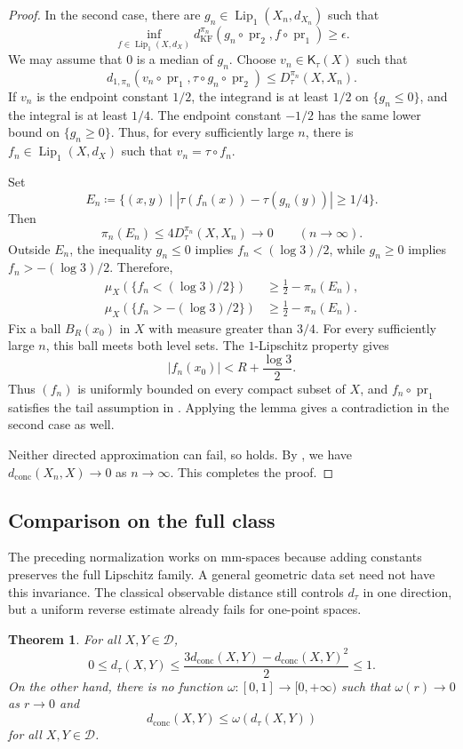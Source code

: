 \documentclass[10pt,a4paper]{amsart}
\newtheorem{theorem}{Theorem}[section]
\newcommand{\D}{\mathcal D}
\newcommand{\Kc}{\mathsf K}
\newcommand{\dconc}{d_{\mathrm{conc}}}
\newcommand{\dtau}{d_{\tau}}
\newcommand{\kf}{d_{\operatorname{KF}}}
\DeclareMathOperator{\pr}{pr}
\begin{document}
\begin{proof}
In the second case, there are $g_n\in\operatorname{Lip}_1(X_n,d_{X_n})$ such that
\[
\inf_{f\in\operatorname{Lip}_1(X,d_X)}
\kf^{\pi_n}(g_n\circ\pr_2,f\circ\pr_1)\geq\epsilon.
\]
We may assume that $0$ is a median of $g_n$. Choose $v_n\in\Kc_\tau(X)$ such that
\[
d_{1,\pi_n}(v_n\circ\pr_1,\tau\circ g_n\circ\pr_2)
\leq D_\tau^{\pi_n}(X,X_n).
\]
If $v_n$ is the endpoint constant $1/2$, the integrand is at least $1/2$ on $\{g_n\leq0\}$, and the integral is at least $1/4$. The endpoint constant $-1/2$ has the same lower bound on $\{g_n\geq0\}$. Thus, for every sufficiently large $n$, there is $f_n\in\operatorname{Lip}_1(X,d_X)$ such that $v_n=\tau\circ f_n$.

Set
\[
E_n\coloneqq
\{(x,y)\mid|\tau(f_n(x))-\tau(g_n(y))|\geq1/4\}.
\]
Then
\[
\pi_n(E_n)\leq4D_\tau^{\pi_n}(X,X_n)\longrightarrow0
\qquad(n\to\infty).
\]
Outside $E_n$, the inequality $g_n\leq0$ implies $f_n<(\log3)/2$, while $g_n\geq0$ implies $f_n>-(\log3)/2$. Therefore,
\[
\begin{aligned}
\mu_X(\{f_n<(\log3)/2\})&\geq\frac12-\pi_n(E_n),\\
\mu_X(\{f_n>-(\log3)/2\})&\geq\frac12-\pi_n(E_n).
\end{aligned}
\]
Fix a ball $B_R(x_0)$ in $X$ with measure greater than $3/4$. For every sufficiently large $n$, this ball meets both level sets. The $1$-Lipschitz property gives
\[
|f_n(x_0)|<R+\frac{\log3}{2}.
\]
Thus $(f_n)$ is uniformly bounded on every compact subset of $X$, and $f_n\circ\pr_1$ satisfies the tail assumption in . Applying the lemma gives a contradiction in the second case as well.

Neither directed approximation can fail, so  holds. By , we have $\dconc(X_n,X)\to0$ as $n\to\infty$. This completes the proof.
\end{proof}

\subsection{Comparison on the full class}
\label{subsec:full-comparison}

The preceding normalization works on mm-spaces because adding constants preserves the full Lipschitz family. A general geometric data set need not have this invariance. The classical observable distance still controls $\dtau$ in one direction, but a uniform reverse estimate already fails for one-point spaces.


\begin{theorem}
\label{thm:comparison}
For all $X,Y\in\D$,
\[
0\leq\dtau(X,Y)
\leq\frac{3\dconc(X,Y)-\dconc(X,Y)^2}{2}
\leq1.
\]
On the other hand, there is no function $\omega\colon[0,1]\to[0,+\infty)$ such that $\omega(r)\to0$ as $r\to0$ and
\[
\dconc(X,Y)\leq\omega(\dtau(X,Y))
\]
for all $X,Y\in\D$.
\end{theorem}
\end{document}
